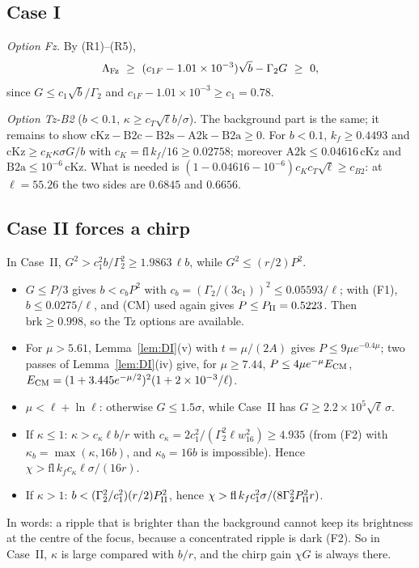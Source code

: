 \subsection{Case I}

\emph{Option Fz.} By (R1)--(R5),
\begin{equation}
\Lambda_{\rm Fz}\ \ge\ (c_{1F}-1.01\times10^{-3})\sqrt b-\Gamma_2G\ \ge\ 0,
\end{equation}
since $G\le c_1\sqrt b/\Gamma_2$ and $c_{1F}-1.01\times10^{-3}\ge c_1=0.78$.

\emph{Option Tz-B2} ($b<0.1$, $\kappa\ge c_T\sqrt\ell b/\sigma$). The background part is the same; it remains to show $\mathrm{cKz}-\mathrm{B2c}-\mathrm{B2s}-\mathrm{A2k}-\mathrm{B2a}\ge0$.
For $b<0.1$, $k_f\ge0.4493$ and $\mathrm{cKz}\ge c_K\kappa\sigma G/b$ with $c_K=\mathrm{fl}\,k_f/16\ge0.02758$; moreover $\mathrm{A2k}\le0.04616\,\mathrm{cKz}$ and $\mathrm{B2a}\le10^{-6}\,\mathrm{cKz}$.
What is needed is $(1-0.04616-10^{-6})c_Kc_T\sqrt\ell\ge c_{B2}$: at $\ell=55.26$ the two sides are $0.6845$ and $0.6656$.

\subsection{Case II forces a chirp}

In Case~II, $G^2>c_1^2b/\Gamma_2^2\ge1.9863\,\ell b$, while $G^2\le(r/2)P^2$.
\begin{itemize}
\item[(c1)] $G\le P/3$ gives $b<c_bP^2$ with $c_b=(\Gamma_2/(3c_1))^2\le0.05593/\ell$; with (F1), $b\le0.0275/\ell$, and (CM) used again gives $P\le P_{\rm II}=0.5223$. Then $\mathrm{brk}\ge0.998$, so the Tz options are available.
\item[(b.1)] For $\mu>5.61$, Lemma~\ref{lem:DI}(v) with $t=\mu/(2A)$ gives $P\le9\mu e^{-0.4\mu}$; two passes of Lemma~\ref{lem:DI}(iv) give, for $\mu\ge7.44$, $P\le4\mu e^{-\mu}E_{\rm CM}$, $E_{\rm CM}=(1+3.445e^{-\mu/2})^2(1+2\times10^{-3}/\ell)$.
\item[(b.2)] $\mu<\ell+\ln\ell$: otherwise $G\le1.5\sigma$, while Case~II has $G\ge2.2\times10^5\sqrt\ell\,\sigma$.
\item[(c2)] If $\kappa\le1$: $\kappa>c_\kappa\ell b/r$ with $c_\kappa=2c_1^2/(\Gamma_2^2\ell w_{16}^2)\ge4.935$ (from (F2) with $\kappa_b=\max(\kappa,16b)$, and $\kappa_b=16b$ is impossible). Hence $\chi>\mathrm{fl}\,k_fc_\kappa\ell\sigma/(16r)$.
\item[(c3)] If $\kappa>1$: $b<(\Gamma_2^2/c_1^2)(r/2)P_{\rm II}^2$, hence $\chi>\mathrm{fl}\,k_fc_1^2\sigma/(8\Gamma_2^2P_{\rm II}^2r)$.
\end{itemize}
In words: a ripple that is brighter than the background cannot keep its brightness at the centre of the focus, because a concentrated ripple is dark (F2).
So in Case~II, $\kappa$ is large compared with $b/r$, and the chirp gain $\chi G$ is always there.

